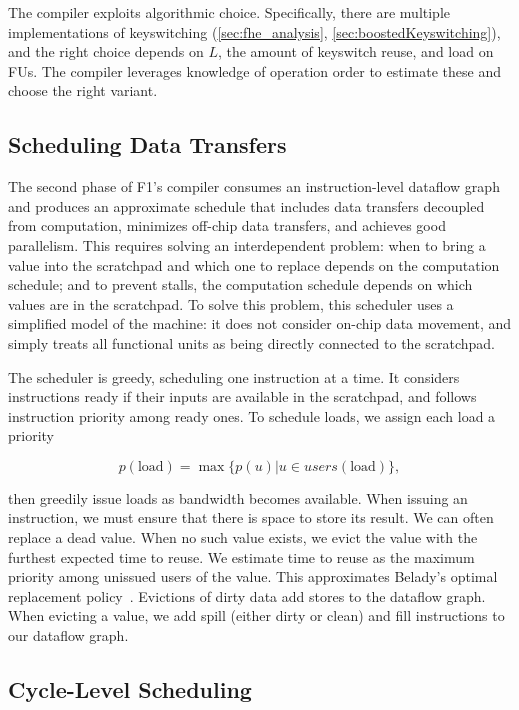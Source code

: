 The compiler exploits algorithmic choice. Specifically, there are multiple
implementations of keyswitching (\autoref{sec:fhe_analysis},
\autoref{sec:boostedKeyswitching}), and the right choice depends on $L$, the
amount of keyswitch reuse, and load on FUs. The compiler leverages knowledge of
operation order to estimate these and choose the right variant.

\subsection{Scheduling Data Transfers}
\label{sec:datatransfers}

The second phase of F1's compiler consumes an instruction-level dataflow graph
and produces an approximate schedule that includes data transfers decoupled
from computation, minimizes off-chip data transfers, and achieves good
parallelism. This requires solving an interdependent problem: when to bring a
value into the scratchpad and which one to replace depends on the computation
schedule; and to prevent stalls, the computation schedule depends on which
values are in the scratchpad. To solve this problem, this scheduler uses a
simplified model of the machine: it does not consider on-chip data movement,
and simply treats all functional units as being directly connected to the
scratchpad.

The scheduler is greedy, scheduling one instruction at a time. It considers
instructions ready if their inputs are available in the scratchpad, and follows
instruction priority among ready ones. To schedule loads, we assign each load a
priority

\begin{equation*}
p(\text{load}) = \max \{ p(u) | u \in users(\text{load})\},
\end{equation*}

then greedily issue loads as bandwidth becomes available. When issuing an
instruction, we must ensure that there is space to store its result. We can
often replace a dead value. When no such value exists, we evict the value with
the furthest expected time to reuse. We estimate time to reuse as the maximum
priority among unissued users of the value. This approximates Belady's optimal
replacement policy~\cite{belady1966study}. Evictions of dirty data add stores
to the dataflow graph. When evicting a value, we add spill (either dirty or
clean) and fill instructions to our dataflow graph.

\subsection{Cycle-Level Scheduling}

